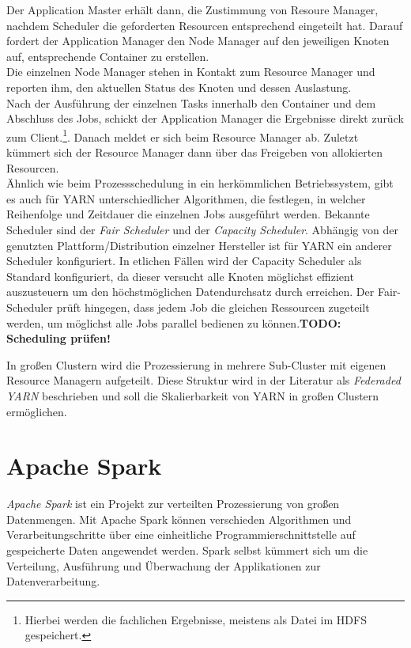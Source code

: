 \noindent
Der Application Master erhält dann, die Zustimmung von Resoure Manager, nachdem Scheduler die geforderten Resourcen entsprechend eingeteilt hat. Darauf fordert der Application Manager den Node Manager auf den jeweiligen Knoten auf, entsprechende Container zu erstellen.\\
Die einzelnen Node Manager stehen in Kontakt zum Resource Manager und reporten ihm, den aktuellen Status des Knoten und dessen Auslastung. \\
Nach der Ausführung der einzelnen Tasks innerhalb den Container und dem Abschluss des Jobs, schickt der Application Manager die Ergebnisse direkt zurück zum Client.\footnote{Hierbei werden die fachlichen Ergebnisse, meistens als Datei im HDFS gespeichert.}. Danach meldet er sich beim Resource Manager ab. Zuletzt kümmert sich der Resource Manager dann über das Freigeben von allokierten Resourcen.\\

\noindent
Ähnlich wie beim Prozessschedulung in ein herkömmlichen Betriebssystem, gibt es auch für YARN unterschiedlicher Algorithmen, die festlegen, in welcher Reihenfolge und Zeitdauer die einzelnen Jobs ausgeführt werden. Bekannte Scheduler sind der \textit{Fair Scheduler} und der \textit{Capacity Scheduler}. Abhängig von der genutzten Plattform/Distribution einzelner Hersteller ist für YARN ein anderer Scheduler konfiguriert. In etlichen Fällen wird der Capacity Scheduler als Standard konfiguriert, da dieser versucht alle Knoten möglichst effizient auszusteuern um den höchstmöglichen Datendurchsatz durch erreichen. Der Fair-Scheduler prüft hingegen, dass jedem Job die gleichen Ressourcen zugeteilt werden, um möglichst alle Jobs parallel bedienen zu können.\textbf{TODO: Scheduling prüfen!}

\noindent
In großen Clustern wird die Prozessierung in mehrere Sub-Cluster mit eigenen Resource Managern aufgeteilt. Diese Struktur wird in der Literatur als \textit{Federaded YARN} beschrieben und soll die Skalierbarkeit von YARN in großen Clustern ermöglichen.

\section{Apache Spark}
\label{sec:theory_spark}

\textit{Apache Spark\texttrademark\thinspace} ist ein Projekt zur verteilten Prozessierung von großen Datenmengen. Mit Apache Spark können verschieden Algorithmen und Verarbeitungschritte über eine einheitliche Programmierschnittstelle auf gespeicherte Daten  angewendet werden. Spark selbst kümmert sich um die Verteilung, Ausführung und Überwachung der Applikationen zur Datenverarbeitung.\cite[S. 2]{learning_spark}\\

